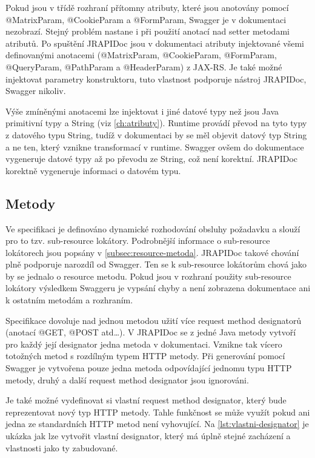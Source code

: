 \documentclass[11pt,twoside,a4paper]{book}
\begin{document}
Pokud jsou v třídě rozhraní přítomny atributy, které jsou anotovány pomocí 
@MatrixParam, @CookieParam a @FormParam, Swagger je v dokumentaci
nezobrazí. Stejný problém nastane i při použití anotací nad setter metodami
atributů. Po spuštění JRAPIDoc jsou v dokumentaci atributy injektované všemi
definovanými anotacemi (@MatrixParam, @CookieParam, @FormParam, @QueryParam,
@PathParam a @HeaderParam) z JAX-RS. Je také možné injektovat parametry
konstruktoru, tuto vlastnost podporuje nástroj JRAPIDoc, Swagger nikoliv.

Výše zmíněnými anotacemi lze injektovat i jiné datové typy než jsou Java
primitivní typy a String (viz \ref{ch:atributy}). Runtime provádí převod na tyto
typy z datového typu String, tudíž v dokumentaci by se měl objevit datový
typ String a ne ten, který vznikne transformací v runtime.
Swagger ovšem do dokumentace vygeneruje datové typy až po převodu ze String, což
není korektní. JRAPIDoc korektně vygeneruje informaci o datovém typu.

\subsection{Metody}

Ve specifikaci je definováno dynamické rozhodování obsluhy požadavku a slouží
pro to tzv. sub-resource lokátory. Podrobnější informace o sub-resource
lokátorech jsou popsány v \ref{subsec:resource-metoda}. JRAPIDoc takové chování
plně podporuje narozdíl od Swagger. Ten se k sub-resource lokátorům chová jako
by se jednalo o resource metodu. Pokud jsou v rozhraní použity sub-resource
lokátory výsledkem Swaggeru je vypsání chyby a není zobrazena dokumentace
ani k ostatním metodám a rozhraním.

Specifikace dovoluje nad jednou metodou užití více request method designatorů
(anotací @GET, @POST atd\ldots). V JRAPIDoc se z jedné Java metody
vytvoří pro každý její designator jedna metoda v dokumentaci. Vznikne tak vícero
totožných metod s rozdílným typem HTTP metody. Při generování pomocí Swagger je
vytvořena pouze jedna metoda odpovídající jednomu typu HTTP metody, druhý a další 
request method designator jsou ignorováni.

Je také možné vydefinovat si vlastní request method designator, který bude
reprezentovat nový typ HTTP metody. Tahle funkčnost se může využít pokud ani
jedna ze standardních HTTP metod není vyhovující. Na \ref{lst:vlastni-designator} je ukázka jak
lze vytvořit vlastní designator, který má úplně stejné zacházení a vlastnosti
jako ty zabudované. 
\end{document}
